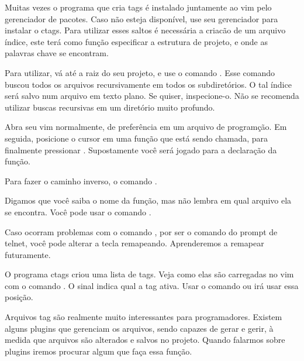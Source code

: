 Muitas vezes o programa que cria tags é instalado juntamente ao vim pelo gerenciador de pacotes.
Caso não esteja disponível, use seu gerenciador para instalar o ctags.
Para utilizar esses saltos é necessária a criacão de um  arquivo índice,
este terá como função especificar a estrutura de projeto,
e onde as palavras chave se encontram.

Para utilizar, vá até a raiz do seu projeto, e use o comando .
Esse comando buscou todos os arquivos recursivamente em todos os subdiretórios.
O tal índice será salvo num arquivo em texto plano. Se quiser, inspecione-o.
Não se recomenda utilizar buscas recursivas em um diretório muito profundo.

Abra seu vim normalmente, de preferência em um arquivo de programção.
Em seguida, posicione o cursor em uma função que está sendo chamada,
para finalmente pressionar \vimcommand{CTRL ]}.
Supostamente você será jogado para a declaração da função.

Para fazer o caminho inverso, o comando .

Digamos que você saiba o nome da função, mas não lembra em qual arquivo ela se encontra.
Você pode usar o comando .

Caso ocorram problemas com o comando \vimcommand{CTRL ]},
por ser o comando  do prompt de telnet,
você pode alterar a tecla remapeando.
Aprenderemos a remapear futuramente.

O programa ctags criou uma lista de tags.
Veja como elas são carregadas no vim com o comando .
O sinal \vimkeys{$>$} indica qual a tag ativa.
Usar o comando  ou  irá usar essa posição.

Arquivos tag são realmente muito interessantes para programadores.
Existem alguns plugins que gerenciam os arquivos, sendo capazes de gerar e gerir,
à medida que arquivos são alterados e salvos no projeto.
Quando falarmos sobre plugins iremos procurar algum que faça essa função.

\newpage
